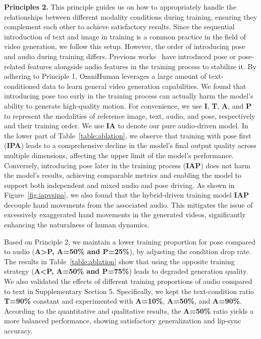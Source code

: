 \textbf{Principles 2.} This principle guides us on how to appropriately handle the relationships between different modality conditions during training, ensuring they complement each other to achieve satisfactory results. Since the sequential introduction of text and image in training is a common practice in the field of video generation, we follow this setup. However, the order of introducing pose and audio during training differs. Previous works~\cite{wang2024vexpress,jiang2024loopy,lin2025cyberhost,EchomimicV2} have introduced pose or pose-related features alongside audio features in the training process to stabilize it. By adhering to Principle 1, OmniHuman leverages a large amount of text-conditioned data to learn general video generation capabilities. We found that introducing pose too early in the training process can actually harm the model's ability to generate high-quality motion. 
For convenience, we use \textbf{I}, \textbf{T}, \textbf{A}, and \textbf{P} to represent the modalities of reference image, text, audio, and pose, respectively and their training order.
We use \textbf{IA} to denote our pure audio-driven model. 
In the lower part of Table~\ref{table:ablation}, we observe that training with pose first (\textbf{IPA}) leads to a comprehensive decline in the model's final output quality across multiple dimensions, affecting the upper limit of the model's performance.
Conversely, introducing pose later in the training process (\textbf{IAP}) does not harm the model's results, achieving comparable metrics and enabling the model to support both independent and mixed audio and pose driving. 
As shown in Figure~\ref{fig:iapvsipa}, we also found that the hybrid-driven training model \textbf{IAP} decouple hand movements from the associated audio. This mitigates the issue of excessively exaggerated hand movements in the generated videos, significantly enhancing the naturalness of human dynamics.


Based on Principle 2, we maintain a lower training proportion for pose compared to audio (\textbf{A\textgreater P, A=50\% and P=25\%}), by adjusting the condition drop rate. The results in Table~\ref{table:ablation} show that using the opposite training strategy (\textbf{A\textless P, A=50\% and P=75\%}) leads to degraded generation quality. We also validated the effects of different training proportions of audio compared to text in Supplementary Section 5. Specifically, we kept the text-condition ratio \textbf{T=90\%} constant and experimented with \textbf{A=10\%}, \textbf{A=50\%}, and \textbf{A=90\%}. According to the quantitative and qualitative results, the \textbf{A=50\%} ratio yields a more balanced performance, showing satisfactory generalization and lip-sync accuracy.



